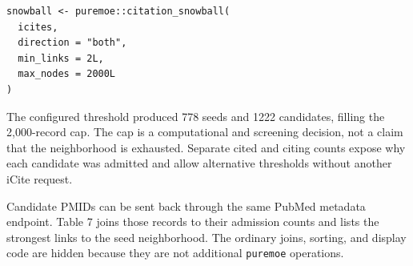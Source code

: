 \begin{verbatim}
snowball <- puremoe::citation_snowball(
  icites,
  direction = "both",
  min_links = 2L,
  max_nodes = 2000L
)
\end{verbatim}

The configured threshold produced 778 seeds and
1222 candidates, filling the 2,000-record cap. The cap is a
computational and screening decision, not a claim that the neighborhood is
exhausted. Separate cited and citing counts expose why each candidate was
admitted and allow alternative thresholds without another iCite request.

Candidate PMIDs can be sent back through the same PubMed metadata endpoint.
Table 7 joins those records to their admission counts and lists the strongest
links to the seed neighborhood. The ordinary joins, sorting, and display code
are hidden because they are not additional \texttt{puremoe} operations.

